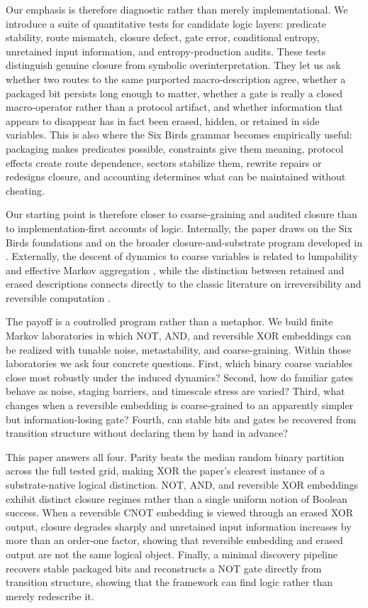 \documentclass[11pt]{article}
\theoremstyle{definition}
\begin{document}
Our emphasis is therefore diagnostic rather than merely implementational. We introduce a suite of quantitative tests for candidate logic layers: predicate stability, route mismatch, closure defect, gate error, conditional entropy, unretained input information, and entropy-production audits. These tests distinguish genuine closure from symbolic overinterpretation. They let us ask whether two routes to the same purported macro-description agree, whether a packaged bit persists long enough to matter, whether a gate is really a closed macro-operator rather than a protocol artifact, and whether information that appears to disappear has in fact been erased, hidden, or retained in side variables. This is also where the Six Birds grammar becomes empirically useful: packaging makes predicates possible, constraints give them meaning, protocol effects create route dependence, sectors stabilize them, rewrite repairs or redesigns closure, and accounting determines what can be maintained without cheating.

Our starting point is therefore closer to coarse-graining and audited closure than to implementation-first accounts of logic. Internally, the paper draws on the Six Birds foundations \cite{tsiokos2026sixbirds} and on the broader closure-and-substrate program developed in \cite{tsiokos2026countstone,tsiokos2026minsubstrate}. Externally, the descent of dynamics to coarse variables is related to lumpability and effective Markov aggregation \cite{buchholz1994lumpability}, while the distinction between retained and erased descriptions connects directly to the classic literature on irreversibility and reversible computation \cite{landauer1961,bennett1973}.

The payoff is a controlled program rather than a metaphor. We build finite Markov laboratories in which NOT, AND, and reversible XOR embeddings can be realized with tunable noise, metastability, and coarse-graining. Within those laboratories we ask four concrete questions. First, which binary coarse variables close most robustly under the induced dynamics? Second, how do familiar gates behave as noise, staging barriers, and timescale stress are varied? Third, what changes when a reversible embedding is coarse-grained to an apparently simpler but information-losing gate? Fourth, can stable bits and gates be recovered from transition structure without declaring them by hand in advance?

This paper answers all four. Parity beats the median random binary partition across the full tested grid, making XOR the paper's clearest instance of a substrate-native logical distinction. NOT, AND, and reversible XOR embeddings exhibit distinct closure regimes rather than a single uniform notion of Boolean success. When a reversible CNOT embedding is viewed through an erased XOR output, closure degrades sharply and unretained input information increases by more than an order-one factor, showing that reversible embedding and erased output are not the same logical object. Finally, a minimal discovery pipeline recovers stable packaged bits and reconstructs a NOT gate directly from transition structure, showing that the framework can find logic rather than merely redescribe it.
\end{document}
